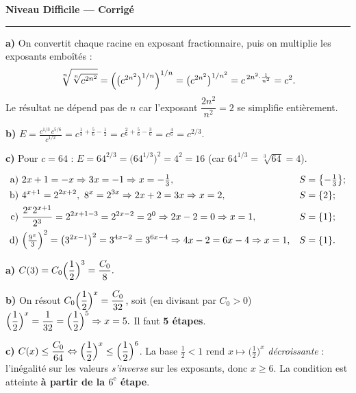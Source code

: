 \documentclass[11pt,a4paper]{article}
\newcommand{\ds}{\displaystyle}
\begin{document}
\begin{center}
{\LARGE\bfseries\color{primarydark} Niveau Difficile — Corrigé}\\[2pt]
{\color{primary}\rule{0.45\textwidth}{1.2pt}}
\end{center}
\vspace{1mm}

\begin{corrige}
\textbf{a)} On convertit chaque racine en exposant fractionnaire, puis on multiplie les exposants emboîtés :
\[ \sqrt[n]{\sqrt[n]{c^{2n^{2}}}}=\Bigl(\bigl(c^{2n^{2}}\bigr)^{1/n}\Bigr)^{1/n}
   =\bigl(c^{2n^{2}}\bigr)^{1/n^{2}}=c^{\,2n^{2}\cdot\frac{1}{n^{2}}}=c^{2}. \]
Le résultat ne dépend pas de $n$ car l'exposant $\dfrac{2n^{2}}{n^{2}}=2$ se simplifie entièrement.

\smallskip
\textbf{b)} $\ds E=\frac{c^{1/3}\,c^{5/6}}{c^{1/2}}=c^{\frac13+\frac56-\frac12}
=c^{\frac{2}{6}+\frac{5}{6}-\frac{3}{6}}=c^{\frac46}=c^{2/3}.$

\smallskip
\textbf{c)} Pour $c=64$ : $E=64^{2/3}=\bigl(64^{1/3}\bigr)^{2}=4^{2}=16$ (car $64^{1/3}=\sqrt[3]{64}=4$).
\end{corrige}

\begin{corrige}
\begin{align*}
\text{a) }&2x+1=-x\Rightarrow 3x=-1\Rightarrow x=-\tfrac13, &&S=\bigl\{-\tfrac13\bigr\};\\
\text{b) }&4^{x+1}=2^{2x+2},\ 8^{x}=2^{3x}\Rightarrow 2x+2=3x\Rightarrow x=2, &&S=\{2\};\\
\text{c) }&\frac{2^{x}2^{x+1}}{2^{3}}=2^{2x+1-3}=2^{2x-2}=2^{0}\Rightarrow 2x-2=0\Rightarrow x=1, &&S=\{1\};\\
\text{d) }&\Bigl(\tfrac{9^{x}}{3}\Bigr)^{2}=\bigl(3^{2x-1}\bigr)^{2}=3^{4x-2}=3^{6x-4}\Rightarrow 4x-2=6x-4\Rightarrow x=1, &&S=\{1\}.
\end{align*}
\end{corrige}

\begin{corrige}
\textbf{a)} $\ds C(3)=C_0\Bigl(\frac12\Bigr)^{3}=\frac{C_0}{8}.$

\smallskip
\textbf{b)} On résout $\ds C_0\Bigl(\frac12\Bigr)^{x}=\frac{C_0}{32}$, soit (en divisant par $C_0>0$)
$\ds\Bigl(\frac12\Bigr)^{x}=\frac{1}{32}=\Bigl(\frac12\Bigr)^{5}\Rightarrow x=5.$ Il faut \textbf{5 étapes}.

\smallskip
\textbf{c)} $\ds C(x)\leq\frac{C_0}{64}\Leftrightarrow\Bigl(\frac12\Bigr)^{x}\leq\Bigl(\frac12\Bigr)^{6}$.
La base $\tfrac12<1$ rend $x\mapsto\bigl(\tfrac12\bigr)^{x}$ \emph{décroissante} : l'inégalité sur les
valeurs \emph{s'inverse} sur les exposants, donc $x\geq 6$. La condition est atteinte \textbf{à partir de la $6^{\text{e}}$ étape}.
\end{corrige}
\end{document}
